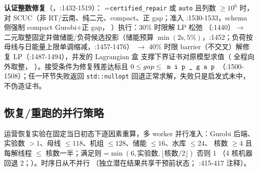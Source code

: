 \begin{sloppypar}
\textbf{认证整数修复}（，:1432-1519）：
=\texttt{certified\_repair} 或 \texttt{auto} 且列数
$\ge10^{6}$ 时，对 SCUC（非 RT/云南、纯二元、compact、正 gap；准入
:1530-1533，schema 侧强制 compact Gurobi+正 gap，
）执行：30\% 时限解 LP 松弛
（:1440）$\to$ 二元取整固定并做储能/负荷候选投影（储能预算
$\min(2\text{s},5\%)$，:1452；负荷按母线与日能量上限单调缩减，:1457-1476）
$\to$ 40\% 时限 barrier（不交叉）解修复 LP（:1487-1494），并发的 Lagrangian 盒
支撑下界证书对原模型求值（ 全程向外取整，
）。接受条件为修复残差达标且
$0\le gap\le\fld{mip\_gap}$（:1500-1508）；任一环节失败返回
\texttt{std::nullopt} 回退正常求解，失败只是启发式未中，不伪造证书。
\end{sloppypar}

\subsection{恢复/重跑的并行策略}
运营恢复实验在固定当日初态下逐因素重算，多 worker 并行准入：Gurobi 后端、
实验数 $>1$、母线 $\le118$、机组 $\le128$、储能 $\le16$、水库 $\le24$、
核数 $\ge4$ 且每解线程 $\le$ 核数一半；满足则
=$\min(6,\text{实验数},\lfloor\text{核数}/2\rfloor)$ 否则 1
（4 核机器回退 2；）。时序日从不并行
（独立潜在结果共享干预前状态； :415-417 注释）。

